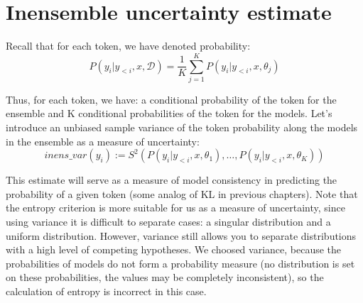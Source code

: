 \documentclass[a4paper,14pt]{extarticle}
\begin{document}
\section{Inensemble uncertainty estimate}
	Recall that for each token, we have denoted probability:
	\begin{equation*}
		P(y_i | y_{<i}, x, \mathcal{D}) = \frac1{K} \sum_{j=1}^{K}P(y_i | y_{<i}, x, \theta_j)
	\end{equation*}
	
	Thus, for each token, we have: a conditional probability of the token for the ensemble and K conditional probabilities of the token for the models. Let's introduce an unbiased sample variance of the token probability along the models in the ensemble as a measure of uncertainty:
	\begin{equation}
		inens\_var(y_i) := S^2(P(y_i | y_{<i}, x, \theta_1), \dots, P(y_i | y_{<i}, x, \theta_K))
	\end{equation}
	
	This estimate will serve as a measure of model consistency in predicting the probability of a given token (some analog of KL in previous chapters). Note that the entropy criterion is more suitable for us as a measure of uncertainty, since using variance it is difficult to separate cases: a singular distribution and a uniform distribution. However, variance still allows you to separate distributions with a high level of competing hypotheses. We choosed variance, because the probabilities of models do not form a probability measure (no distribution is set on these probabilities, the values may be completely inconsistent), so the calculation of entropy is incorrect in this case.
	
\end{document}
